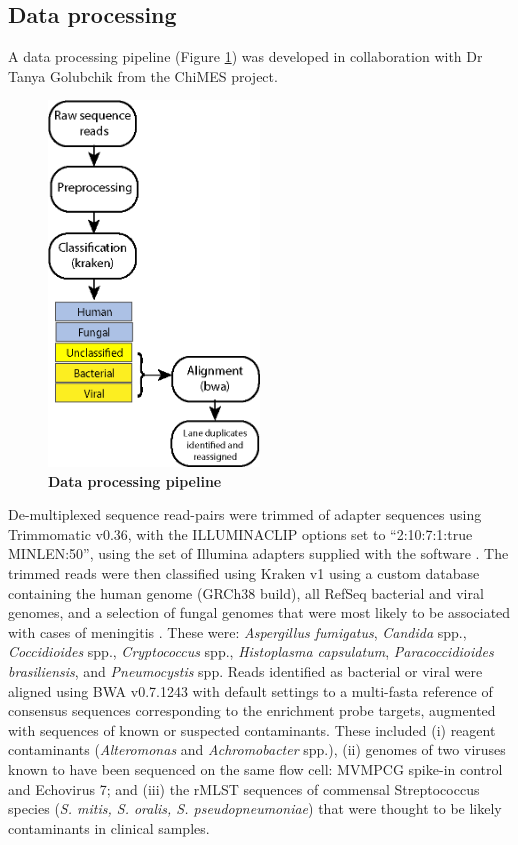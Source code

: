 \subsection{Data processing}
A data processing pipeline (Figure \ref{fig:dataprocessing}) was developed in collaboration with Dr Tanya Golubchik from the ChiMES project. 

\FloatBarrier
\begin{figure}[htbp]
\centering
\includegraphics[width=0.5\textwidth]{./Results1/Images/data-processing.png}
\caption[Data Processing Pipeline]{\textbf{Data processing pipeline}}
\label{fig:dataprocessing}
\end{figure}
\FloatBarrier

De-multiplexed sequence read-pairs were trimmed of adapter sequences using Trimmomatic v0.36, with the ILLUMINACLIP options set to “2:10:7:1:true MINLEN:50”, using the set of Illumina adapters supplied with the software \parencite{Bolger2014}. The trimmed reads were then classified using Kraken v1 \parencite{Wood2014} using a custom database containing the human genome (GRCh38 build), all RefSeq bacterial and viral genomes, and a selection of fungal genomes that were most likely to be associated with cases of meningitis \parencite{Cuomo2017}. These were: \textit{Aspergillus fumigatus}, \textit{Candida} spp., \textit{Coccidioides} spp., \textit{Cryptococcus} spp., \textit{Histoplasma capsulatum}, \textit{Paracoccidioides brasiliensis}, and \textit{Pneumocystis} spp. Reads identified as bacterial or viral were aligned using BWA v0.7.1243 with default settings to a multi-fasta reference of consensus sequences corresponding to the enrichment probe targets, augmented with sequences of known or suspected contaminants. These included (i) reagent contaminants (\textit{Alteromonas} and \textit{Achromobacter} spp.), (ii) genomes of two viruses known to have been sequenced on the same flow cell: MVMPCG spike-in control and Echovirus 7; and (iii) the rMLST sequences of commensal Streptococcus species (\textit{S. mitis, S. oralis, S. pseudopneumoniae}) that were thought to be likely contaminants in clinical samples.

